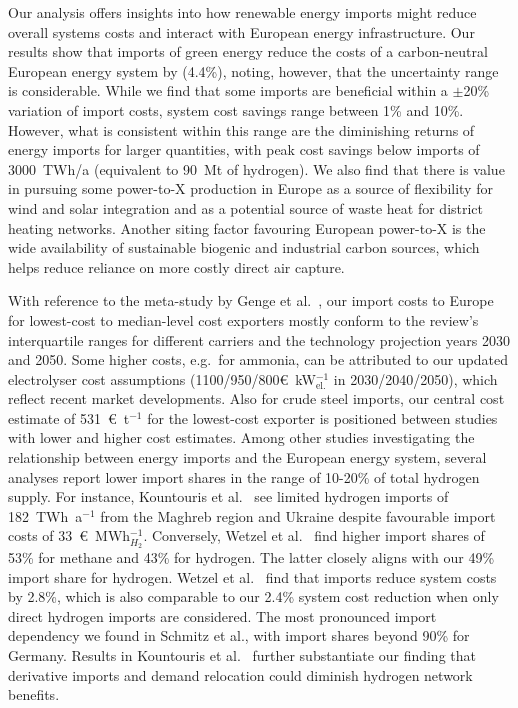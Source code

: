 Our analysis offers insights into how renewable energy imports might reduce
overall systems costs and interact with European energy infrastructure. Our
results show that imports of green energy reduce the costs of a carbon-neutral
European energy system by  (4.4\%), noting, however, that the
uncertainty range is considerable. While we find that some imports are
beneficial within a $\pm$20\% variation of import costs, system cost savings
range between 1\% and 10\%. However, what is consistent within this range are
the diminishing returns of energy imports for larger quantities, with peak cost
savings below imports of 3000~TWh/a (equivalent to 90~Mt of hydrogen). We also find
that there is value in pursuing some \mbox{power-to-X} production in Europe as a
source of flexibility for wind and solar integration and as a potential source
of waste heat for district heating networks. Another siting factor favouring
European \mbox{power-to-X} is the wide availability of sustainable biogenic and
industrial carbon sources, which helps reduce reliance on more costly direct air
capture.

With reference to the meta-study by Genge et al.~\cite{gengeSupplyCostsGreen2023},
our import costs to Europe for lowest-cost to median-level cost exporters
mostly conform to the review's interquartile ranges for different carriers and
the technology projection years 2030 and 2050. Some higher costs, e.g.~for
ammonia, can be attributed to our updated electrolyser cost assumptions
(1100/950/800\euro{}~kW$_\text{el.}^{-1}$ in 2030/2040/2050), which reflect
recent market developments.\cite{ieaGlobalHydrogenReview2024} Also for crude
steel imports, our central cost estimate of 531~\euro{}~t$^{-1}$ for the
lowest-cost exporter is positioned between studies with
lower\cite{lopezDefossilisedSteel2023} and
higher\cite{verpoortImpactGlobalHeterogeneity2024} cost estimates. Among other
studies investigating the relationship between energy imports and the European
energy system, several analyses report lower import shares in the range of
10-20\% of total hydrogen
supply.\cite{seckHydrogenDecarbonization2022,frischmuthHydrogenSourcingStrategies2022,kountourisUnifiedEuropeanHydrogen2024}
For instance, Kountouris et al.~\cite{kountourisUnifiedEuropeanHydrogen2024} see
limited hydrogen imports of 182~TWh~a$^{-1}$ from the Maghreb region and Ukraine
despite favourable import costs of 33~\euro{}~MWh$_{H_2}^{-1}$. Conversely,
Wetzel et al.~\cite{wetzelGreenEnergy2023a} find higher import shares of 53\%
for methane and 43\% for hydrogen. The latter closely aligns with our 49\%
import share for hydrogen. Wetzel et al.~\cite{wetzelGreenEnergy2023a} find that
imports reduce system costs by 2.8\%, which is also comparable to our 2.4\%
system cost reduction when only direct hydrogen imports are considered. The most
pronounced import dependency we found in Schmitz et
al.\cite{schmitzImplicationsHydrogenImport2024a}, with import shares beyond 90\%
for Germany. Results in Kountouris et
al.~\cite{kountourisUnifiedEuropeanHydrogen2024} further substantiate our
finding that derivative imports and demand relocation could diminish hydrogen
network benefits.

